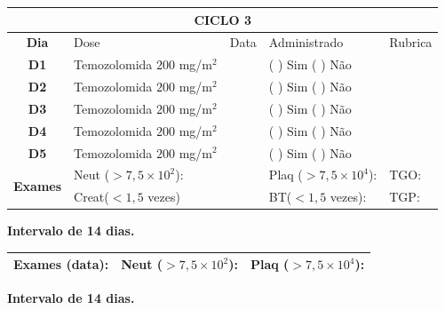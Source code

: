 \documentclass[11pt,a4paper,oldfontcommands]{memoir}
\begin{document}
\begin{center}
\begin{longtable}{p{1cm}p{4cm}|p{1cm}|p{4.6cm}|p{3cm}}
	\hline
	\multicolumn{5}{c}{\textbf{CICLO 3}}\\
\hline
    \multicolumn{1}{c|}{\multirow{1}{*}{\textbf{Dia}}}&{Dose}&{Data}&{Administrado}&{Rubrica} \\
    \hline
    \multicolumn{1}{c|}{\multirow{1}{*}{\textbf{D1}}}&{Temozolomida \(200\) mg/m\(^2\)}&&{(  ) Sim (  ) Não}&\\
    \multicolumn{1}{c|}{\multirow{1}{*}{\textbf{D2}}}&{Temozolomida \(200\) mg/m\(^2\)}&&{(  ) Sim (  ) Não}&\\
    \multicolumn{1}{c|}{\multirow{1}{*}{\textbf{D3}}}&{Temozolomida \(200\) mg/m\(^2\)}&&{(  ) Sim (  ) Não}&\\
    \multicolumn{1}{c|}{\multirow{1}{*}{\textbf{D4}}}&{Temozolomida \(200\) mg/m\(^2\)}&&{(  ) Sim (  ) Não}&\\
    \multicolumn{1}{c|}{\multirow{1}{*}{\textbf{D5}}}&{Temozolomida \(200\) mg/m\(^2\)}&&{(  ) Sim (  ) Não}&\\
    \hline
    \multicolumn{1}{c|}{\multirow{2}{*}{\textbf{Exames}}}&\multicolumn{2}{l|}{Neut (\(>7,5\times10^2\)):}&{Plaq (\(>7,5\times10^4\)):}&{TGO:}\\
    \cline{2-5}
    \multicolumn{1}{c|}{\multirow{2}{*}{{}}}&\multicolumn{2}{l|}{Creat(\(<1,5\) vezes)}&{BT(\(<1,5\) vezes):}&{TGP:}
    \\
    \hline
\end{longtable}
\textbf{Intervalo de 14 dias.}
\begin{longtable}{p{5cm}|p{5cm}|p{4.5cm}}
    \hline
    \textbf{Exames (data):}&{Neut (\(>7,5\times10^2\)):}&{Plaq (\(>7,5\times10^4\)):}
    \\
    \hline
\end{longtable}
\textbf{Intervalo de 14 dias.}
\\[1.5cm]
\end{center}
\end{document}
